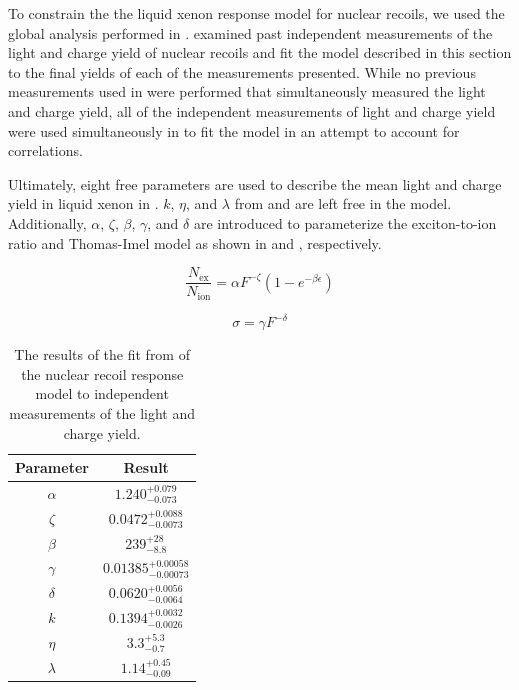 To constrain the the liquid xenon response model for nuclear recoils, we used the global analysis performed in .   examined past independent measurements of the light and charge yield of nuclear recoils and fit the model described in this section to the final yields of each of the measurements presented.  While no previous measurements used in  were performed that simultaneously measured the light and charge yield, all of the independent measurements of light and charge yield were used simultaneously in  to fit the model in an attempt to account for correlations.  

Ultimately, eight free parameters are used to describe the mean light and charge yield in liquid xenon in .  $k$, $\eta$, and $\lambda$ from  and  are left free in the model.  Additionally, $\alpha$, $\zeta$, $\beta$, $\gamma$, and $\delta$ are introduced to parameterize the exciton-to-ion ratio and Thomas-Imel model as shown in  and , respectively.


\begin{equation}
        \label{eqn:xe1t_ex_ion_parameterization}
        \frac{N_{\textrm{ex}}}{N_{\textrm{ion}}} = \alpha F^{-\zeta} (1 - e^{-\beta \epsilon})
\end{equation}

\begin{equation}
        \label{eqn:ti_model_parameterization}
        \sigma = \gamma F^{-\delta}
\end{equation}

\begin{table}[t]
\centering
\def\arraystretch{1.3}
\begin{tabular}{|c|c|}
\hline
Parameter & Result \\
\hline
$\alpha$ & $1.240^{+0.079}_{-0.073}$ \\ \hline
$\zeta$ & $0.0472^{+0.0088}_{-0.0073}$ \\ \hline
$\beta$ & $239^{+28}_{-8.8}$ \\ \hline
$\gamma$ & $0.01385^{+0.00058}_{-0.00073}$ \\ \hline
$\delta$ & $0.0620^{+0.0056}_{-0.0064}$ \\ \hline
$k$ & $0.1394^{+0.0032}_{-0.0026}$ \\ \hline
$\eta$ & $3.3^{+5.3}_{-0.7}$ \\ \hline
$\lambda$ & $1.14^{+0.45}_{-0.09}$ \\ \hline
\end{tabular}
\caption{The results of the fit from  of the nuclear recoil response model to independent measurements of the light and charge yield.}
\label{tab:xe1t_nest_results}
\end{table}

